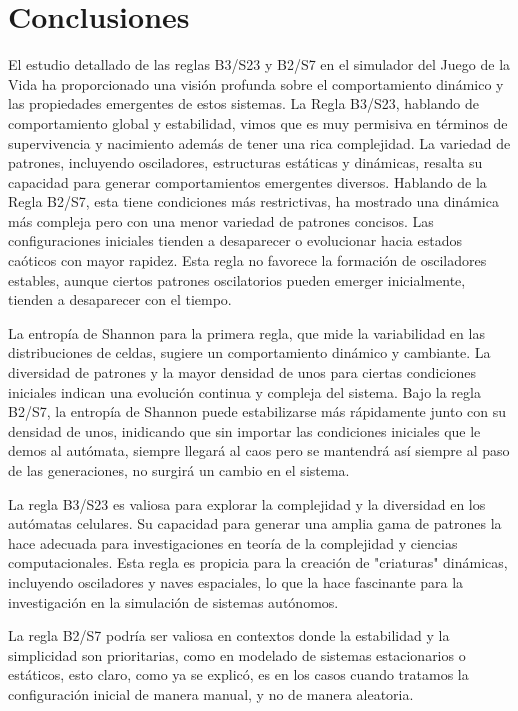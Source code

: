 \documentclass{article}
\begin{document}
 	\section{Conclusiones}
 		
 		El estudio detallado de las reglas B3/S23 y B2/S7 en el simulador del Juego de la Vida ha proporcionado una visión profunda sobre el comportamiento dinámico y las propiedades emergentes de estos sistemas.
 		La Regla B3/S23, hablando de comportamiento global y estabilidad, vimos que es muy permisiva en términos de supervivencia y nacimiento además de tener una rica complejidad. La variedad de patrones, incluyendo osciladores, estructuras estáticas y dinámicas, resalta su capacidad para generar comportamientos emergentes diversos.
 		Hablando de la Regla B2/S7, esta tiene condiciones más restrictivas, ha mostrado una dinámica más compleja pero con una menor variedad de patrones concisos. Las configuraciones iniciales tienden a desaparecer o evolucionar hacia estados caóticos con mayor rapidez.
 		Esta regla no favorece la formación de osciladores estables, aunque ciertos patrones oscilatorios pueden emerger inicialmente, tienden a desaparecer con el tiempo.
 		
 		La entropía de Shannon para la primera regla, que mide la variabilidad en las distribuciones de celdas, sugiere un comportamiento dinámico y cambiante. La diversidad de patrones y la mayor densidad de unos para ciertas condiciones iniciales indican una evolución continua y compleja del sistema.
 		Bajo la regla B2/S7, la entropía de Shannon puede estabilizarse más rápidamente junto con su densidad de unos, inidicando que sin importar las condiciones iniciales que le demos al autómata, siempre llegará al caos pero se mantendrá así siempre al paso de las generaciones, no surgirá un cambio en el sistema.
 		
 		
 		La regla B3/S23 es valiosa para explorar la complejidad y la diversidad en los autómatas celulares. Su capacidad para generar una amplia gama de patrones la hace adecuada para investigaciones en teoría de la complejidad y ciencias computacionales.
 		Esta regla es propicia para la creación de "criaturas" dinámicas, incluyendo osciladores y naves espaciales, lo que la hace fascinante para la investigación en la simulación de sistemas autónomos.
 		
 		La regla B2/S7 podría ser valiosa en contextos donde la estabilidad y la simplicidad son prioritarias, como en modelado de sistemas estacionarios o estáticos, esto claro, como ya se explicó, es en los casos cuando tratamos la configuración inicial de manera manual, y no de manera aleatoria.
 		
\end{document}
